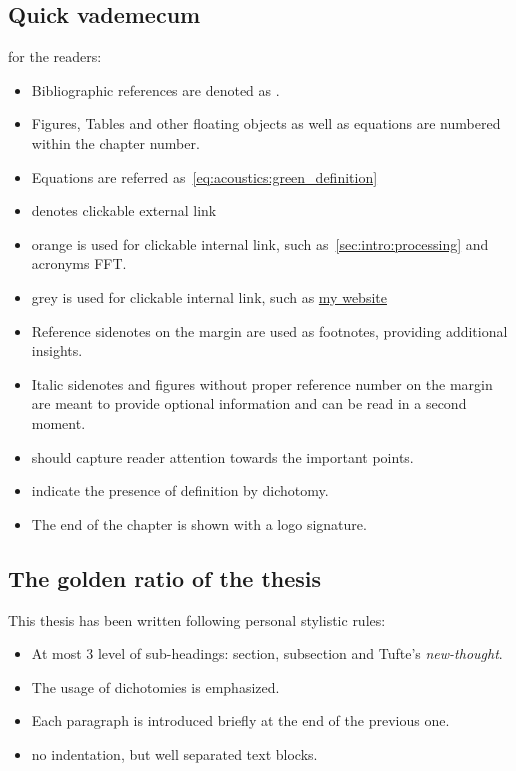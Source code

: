 \subsection{Quick vademecum} for the readers:
\begin{itemize}
    \item Bibliographic references are denoted as .
    \item Figures, Tables and other floating objects as well as equations are numbered within the chapter number.
    \item Equations are referred as~\cref{eq:acoustics:green_definition}
    \item \ExternalLink denotes clickable external link
    \item \textcolor{myorange}{orange} is used for clickable internal link, such as~\cref{sec:intro:processing} and acronyms \acs{FFT}.
    \item \textcolor{mygray}{grey} is used for clickable internal link, such as \href{www.diegodicarlo.com}{my website\ExternalLink}
    \item Reference sidenotes on the margin are used as footnotes, providing additional insights.
    \item Italic sidenotes and figures without proper reference number on the margin are meant to provide optional information and can be read in a second moment.
    \item \textcolor{black!30}{\scriptsize\raisebox{1pt}{$\blacktriangleright$}} should capture reader attention towards the important points.
    \item \textcolor{black!30}{\scriptsize\raisebox{1pt}{$\rightleftarrows$}} indicate the presence of definition by dichotomy.
    \item The end of the chapter is shown with a logo signature.
\end{itemize}

\subsection{The golden ratio of the thesis}
This thesis has been written following personal stylistic rules:
\begin{itemize}
    \item At most 3 level of sub-headings: section, subsection and Tufte's \textit{new-thought}.
    \item The usage of dichotomies is emphasized.
    \item Each paragraph is introduced briefly at the end of the previous one.
    \item no indentation, but well separated text blocks.
\end{itemize}